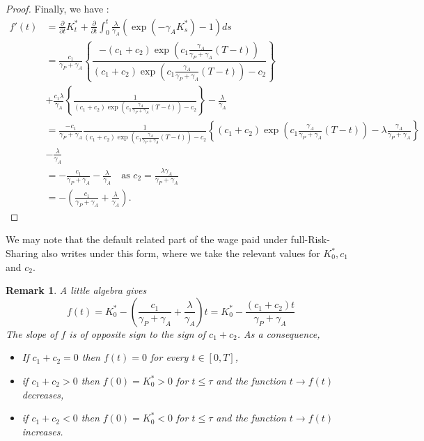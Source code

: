 \documentclass[numbook, envcountsect, envcountsame, envcountreset, runningheads, smallextended]{article}
\newtheorem{Remark}{Remark}[part]
\begin{document}
\begin{proof}
 Finally, we have : 
 \begin{align*}
  f'(t) &= \frac{\partial }{\partial t} K^*_t +  \frac{\partial}{\partial t}\int_0^t \frac{\lambda}{\gamma_A}\left(\exp(-\gamma_A K^*_s) - 1 \right) ds\\
  &=  \frac{c_1}{\gamma_P + \gamma_A} \left\{ \dfrac{-(c_1+c_2)\exp\left(c_1 \frac{\gamma_A}{\gamma_P+\gamma_A}(T-t)\right) }{  (c_1+c_2)\exp\left(c_1 \frac{\gamma_A}{\gamma_P+\gamma_A}(T-t)\right) - c_2} \right\} \\
  &+  \frac{c_1 \lambda}{\gamma_A} \left\{ \frac{1}{ (c_1 + c_2)\exp\left(c_1 \frac{\gamma_A}{\gamma_P+\gamma_A}(T-t)\right) - c_2 } \right\} - \frac{\lambda}{\gamma_A}\\
  &=   \frac{-c_1}{\gamma_P + \gamma_A}  \frac{1}{ (c_1 + c_2)\exp\left(c_1 \frac{\gamma_A}{\gamma_P+\gamma_A}(T-t)\right) - c_2 }\left\{ (c_1 + c_2)\exp\left(c_1 \frac{\gamma_A}{\gamma_P+\gamma_A}(T-t)\right) - \lambda \frac{\gamma_A}{\gamma_P + \gamma_A}\right\} \\
  & -\frac{\lambda}{\gamma_A} \\
  & = -\frac{c_1}{\gamma_P + \gamma_A }- \frac{\lambda}{\gamma_A}\quad \text{as $c_2 = \frac{\lambda \gamma_A}{\gamma_P + \gamma_A}$}\\
  & =  -\left( \frac{c_1}{\gamma_P + \gamma_A} + \frac{\lambda}{\gamma_A}\right).
 \end{align*}
 \end{proof}
 
 We may note that the default related part of the wage paid under full-Risk-Sharing also writes under this form, where we take the relevant values for $K_0^*, c_1$ and $c_2$. 
 \begin{Remark}
A little algebra gives
$$ f(t) = K^*_0  -\left( \frac{c_1}{\gamma_P + \gamma_A} + \frac{\lambda}{\gamma_A}\right)t = K^*_0  - \frac{\left( c_1 + c_2 \right)t}{\gamma_P + \gamma_A} $$
The slope of $f$ is of opposite sign to the sign of $c_1+c_2$. As a consequence, 
\begin{itemize}
\item If $c_1+c_2=0$ then $f(t)=0$ for every $t \in [0,T]$,
\item if $c_1+c_2>0$ then $f(0)=K^*_0>0$ for $t \le \tau$ and the function $t \to f(t)$ decreases,
\item if $c_1+c_2<0$ then $f(0)=K^*_0 <0$ for $t \le \tau$ and the function $t \to f(t)$ increases.
\end{itemize}
\end{Remark}
\end{document}
